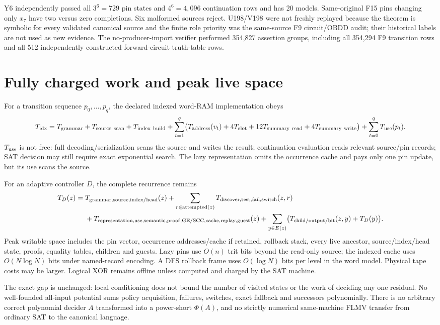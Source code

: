\documentclass[11pt]{article}
\begin{document}
Y6 independently passed all $3^6=729$ pin states and $4^6=4,096$ continuation rows and has 20 models. Same-original F15 pins changing only $x_7$ have two versus zero completions. Six malformed sources reject. U198/V198 were not freshly replayed because the theorem is symbolic for every validated canonical source and the finite role priority was the same-source F9 circuit/OBDD audit; their historical labels are not used as new evidence. The no-producer-import verifier performed 354,827 assertion groups, including all 354,294 F9 transition rows and all 512 independently constructed forward-circuit truth-table rows.

\section{Fully charged work and peak live space}
For a transition sequence $p_0,\ldots,p_q$, the declared indexed word-RAM implementation obeys
\[
T_{\rm idx}=T_{\rm grammar}+T_{\rm source\ scan}+T_{\rm index\ build}
+\sum_{t=1}^{q}\bigl(T_{\rm address}(v_t)+4T_{\rm slot}+12T_{\rm summary\ read}+4T_{\rm summary\ write}\bigr)
+\sum_{t=0}^{q}T_{\rm use}(p_t).
\]
$T_{\rm use}$ is not free: full decoding/serialization scans the source and writes the result; continuation evaluation reads relevant source/pin records; SAT decision may still require exact exponential search. The lazy representation omits the occurrence cache and pays only one pin update, but its use scans the source.

For an adaptive controller $D$, the complete recurrence remains
\[
\begin{split}
T_D(z)={}&T_{\rm grammar,source,index/head}(z)
+\sum_{r\in\mathrm{attempted}(z)}T_{\rm discover,test,fail,switch}(z,r)\\
&+T_{\rm representation,use,semantic,proof,GE/SCC,cache,replay,guest}(z)
+\sum_{y\in E(z)}\bigl(T_{\rm child/output/bit}(z,y)+T_D(y)\bigr).
\end{split}
\]
Peak writable space includes the pin vector, occurrence addresses/cache if retained, rollback stack, every live ancestor, source/index/head state, proofs, equality tables, children and guests. Lazy pins use $O(n)$ trit bits beyond the read-only source; the indexed cache uses $O(N\log N)$ bits under named-record encoding. A DFS rollback frame uses $O(\log N)$ bits per level in the word model. Physical tape costs may be larger. Logical XOR remains offline unless computed and charged by the SAT machine.

The exact gap is unchanged: local conditioning does not bound the number of visited states or the work of deciding any one residual. No well-founded all-input potential sums policy acquisition, failures, switches, exact fallback and successors polynomially. There is no arbitrary correct polynomial decider $A$ transformed into a power-short $\Phi(A)$, and no strictly numerical same-machine FLMV transfer from ordinary SAT to the canonical language.
\end{document}
